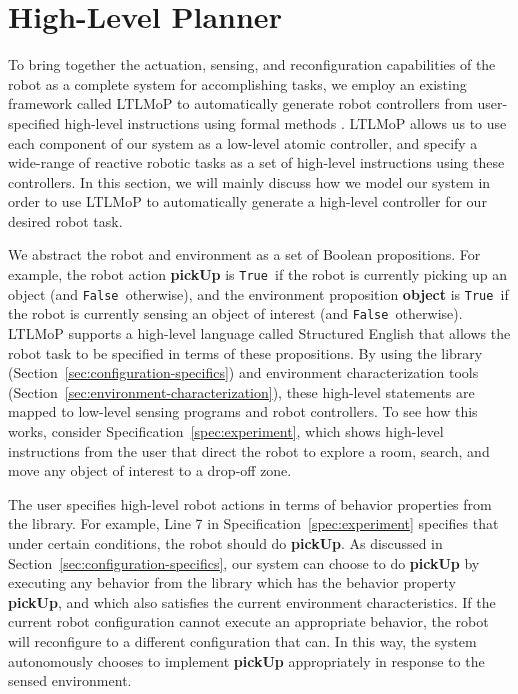 \documentclass[conference]{IEEEtran}
\newcommand{\lt}{{\tt True }}
\newcommand{\lf}{{\tt False }}
\begin{document}
\section{High-Level Planner}
\label{sec:high-level}

To bring together the actuation, sensing, and reconfiguration capabilities of  the  robot as a complete system for accomplishing  tasks, we employ an existing framework called LTLMoP to automatically generate robot controllers from user-specified high-level instructions using formal methods \cite{DBLP:conf/iros/FinucaneJK10,DBLP:journals/trob/Kress-GazitFP09}.
LTLMoP allows us to use each component of our system as a low-level atomic controller, and specify a wide-range of reactive robotic tasks as a set of high-level instructions using these controllers.
In this section, we will mainly discuss how we model our system in order to use LTLMoP to automatically generate a high-level controller for our desired robot task.

We abstract the robot and environment as a set of Boolean propositions.
For example, the robot action \textbf{pickUp} is \lt if the robot is currently picking up an object (and \lf otherwise), and the environment proposition \textbf{object} is \lt if the robot is currently sensing an object of interest (and \lf otherwise).
LTLMoP supports a high-level language called Structured English that allows the robot task to be specified in terms of these propositions.
By using the library (Section~\ref{sec:configuration-specifics})  and environment characterization tools (Section~\ref{sec:environment-characterization}), these high-level statements are mapped to low-level sensing programs and robot controllers.
To see how this works, consider Specification~\ref{spec:experiment}, which shows  high-level instructions from the user that direct the robot to explore a room, search, and move any object of interest to a drop-off zone.

The user specifies high-level robot actions in terms of behavior properties from the library.  For example, Line 7 in Specification~\ref{spec:experiment} specifies that under certain conditions, the robot should do \textbf{pickUp}.  As discussed in Section~\ref{sec:configuration-specifics}, our system can choose to do \textbf{pickUp} by executing any behavior from the library which has the behavior property \textbf{pickUp}, and which also satisfies the current environment characteristics. If the current robot configuration cannot execute an appropriate behavior, the robot will reconfigure to a different configuration that can.  In this way, the system autonomously chooses to implement  \textbf{pickUp}  appropriately in response to the sensed environment.
\end{document}
